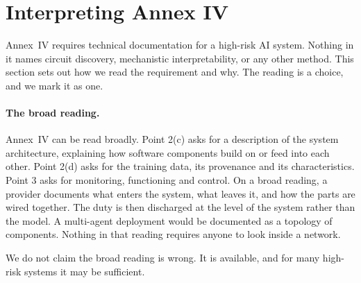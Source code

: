 \documentclass[letterpaper]{article} %
\begin{document}
%
%
\section{Interpreting Annex IV}

Annex~IV requires technical documentation for a high-risk AI system. Nothing in
it names circuit discovery, mechanistic interpretability, or any other method.
This section sets out how we read the requirement and why. The reading is a
choice, and we mark it as one.

\paragraph{The broad reading.}
Annex~IV can be read broadly. Point 2(c) asks for a description of the system
architecture, explaining how software components build on or feed into each
other. Point 2(d) asks for the training data, its provenance and its
characteristics. Point 3 asks for monitoring, functioning and control. On a broad
reading, a provider documents what enters the system, what leaves it, and how the
parts are wired together. The duty is then discharged at the level of the system
rather than the model. A multi-agent deployment would be documented as a topology
of components. Nothing in that reading requires anyone to look inside a network.

We do not claim the broad reading is wrong. It is available, and for many
high-risk systems it may be sufficient.
\end{document}
